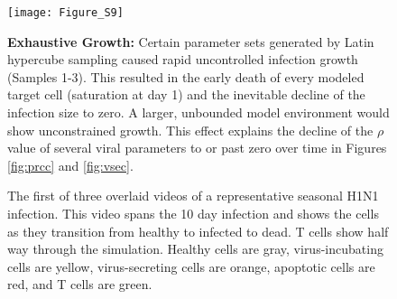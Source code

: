 \documentclass[preprint,10pt,authoryear]{article}
\newcommand{\drew}[1]{{\color{dkgreen}#1}}
\begin{document}
\begin{figure}[ht!]
\begin{center}
	\texttt{[image: Figure\_S9]}
	\caption{\textbf{Exhaustive Growth:} Certain parameter sets generated by Latin hypercube sampling caused rapid uncontrolled infection growth (Samples 1-3).  This resulted in the early death of every modeled target cell (saturation at day 1) and the inevitable decline of the infection size to zero.  A larger, unbounded model environment would show unconstrained growth.  This effect explains the decline of the $\rho$ value of several viral parameters to or past zero over time in Figures \ref{fig:prcc} and \ref{fig:vsec}.}
	\label{fig:exhaustive}
\end{center}
\end{figure}







\setcounter{figure}{0}
\renewcommand{\figurename}{Video}


\begin{figure}[ht!]
\caption{The first of three overlaid videos of a representative seasonal H1N1 infection.  This video spans the 10 day infection and shows the cells as they transition from healthy to infected to dead.  T cells show half way through the simulation.  Healthy cells are gray, virus-incubating cells are yellow, virus-secreting cells are orange, apoptotic cells are red, and T cells are green.} 
 \label{video:cell_view}
\end{figure}
\end{document}

